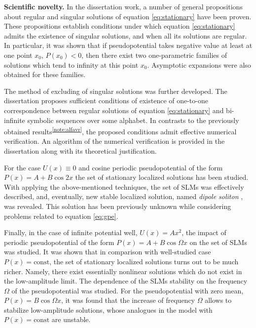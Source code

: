 \documentclass[candidate, href, colorlinks]{disser}
\begin{document}
\textbf{Scientific novelty.}
In the dissertation work, a number of general propositions about regular and singular solutions of equation \eqref{eq:stationary} have been proven.
These propositions establish conditions under which equation \eqref{eq:stationary} admits the existence of singular solutions, and when all its solutions are regular.
In particular, it was shown that if pseudopotential takes negative value at least at one point $x_0$, $P(x_0) < 0$, then there exist two one-parametric families of solutions which tend to infinity at this point $x_0$.
Asymptotic expansions were also obtained for these families.

The method of excluding of singular solutions was further developed.
The dissertation proposes sufficient conditions of existence of one-to-one correspondence between regular solutions of equation \eqref{eq:stationary} and bi-infinite symbolic sequences over some alphabet. 
In contrasts to the previously obtained results\textsuperscript{\ref{note:alfavr}}, the proposed conditions admit effective numerical verification.
An algorithm of the numerical verification is provided in the dissertation along with its theoretical justification.

For the case $U(x) \equiv 0$ and cosine periodic pseudopotential of the form $P(x) = A + B \cos 2x$ the set of stationary localized solutions has been studied.
With applying the above-mentioned techniques, the set of SLMs was effectively described, and, eventually, new stable localized solution, named {\it dipole soliton} \cite{LebedevAlfimovMalomed}, was revealed.
This solution has been previously unknown while considering problems related to equation \eqref{eq:gpe}.

Finally, in the case of infinite potential well, $U(x) = A x^2$, the impact of periodic pseudopotential of the form $P(x) = A + B \cos \Omega x$ on the set of SLMs was studied.
It was shown that in comparison with well-studied case $P(x) = \mathrm{const}$, the set of stationary localized solutions turns out to be much richer.
Namely, there exist essentially nonlinear solutions which do not exist in the low-amplitude limit.
The dependence of the SLMs stability on the frequency $\Omega$ of the pseudopotential was studied.
For the pseudopotential with zero mean, $P(x) = B \cos \Omega x$, it was found that the increase of frequency $\Omega$ allows to stabilize low-amplitude solutions, whose analogues in the model with $P(x) = \mathrm{const}$ are unstable.

\end{document}
